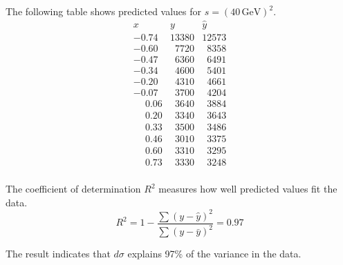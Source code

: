 The following table shows predicted values for $s=(40\,\text{GeV})^2$.
\begin{equation*}
\begin{matrix}
x & y & \hat{y}\\
-0.74 & 13380 & 12573\\
-0.60 & \phantom{0}7720 & \phantom{0}8358\\
-0.47 & \phantom{0}6360 & \phantom{0}6491\\
-0.34 & \phantom{0}4600 & \phantom{0}5401\\
-0.20 & \phantom{0}4310 & \phantom{0}4661\\
-0.07 & \phantom{0}3700 & \phantom{0}4204\\
\phantom{+}0.06 & \phantom{0}3640 & \phantom{0}3884\\
\phantom{+}0.20 & \phantom{0}3340 & \phantom{0}3643\\
\phantom{+}0.33 & \phantom{0}3500 & \phantom{0}3486\\
\phantom{+}0.46 & \phantom{0}3010 & \phantom{0}3375\\
\phantom{+}0.60 & \phantom{0}3310 & \phantom{0}3295\\
\phantom{+}0.73 & \phantom{0}3330 & \phantom{0}3248\\
\end{matrix}
\end{equation*}

The coefficient of determination $R^2$ measures how well predicted values fit the data.
\begin{equation*}
R^2=1-\frac{\sum(y-\hat{y})^2}{\sum(y-\bar{y})^2}=0.97
\end{equation*}

The result indicates that $d\sigma$ explains 97\% of the variance in the data.


